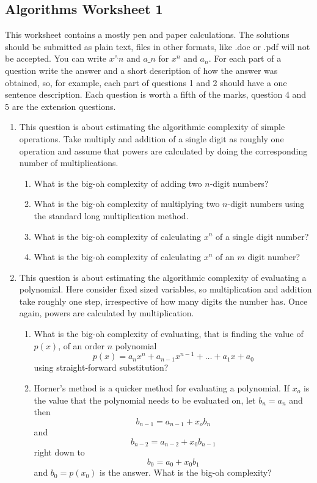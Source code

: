 \documentclass[11pt,a4paper]{scrartcl}
\begin{document}
\subsection*{Algorithms Worksheet 1}

This worksheet contains a mostly pen and paper calculations. The
solutions should be submitted as plain text, files in other formats,
like .doc or .pdf will not be accepted. You can write $x^\wedge n$ and
$a\_n$ for $x^n$ and $a_n$. For each part of a question write the
answer and a short description of how the answer was obtained, so, for
example, each part of questions 1 and 2 should have a one sentence
description. Each question is worth a fifth of the marks, question 4
and 5 are the extension questions.

\begin{enumerate}

\item This question is about estimating the algorithmic
  complexity of simple operations. Take multiply and addition of a
  single digit as roughly one operation and assume that powers are
  calculated by doing the corresponding number of multiplications.

\begin{enumerate}
\item What is the big-oh complexity of adding two $n$-digit numbers?
\item What is the big-oh complexity of multiplying two $n$-digit numbers
  using the standard long multiplication method.
\item What is the big-oh complexity of calculating $x^n$ of a single
  digit number?
\item What is the big-oh complexity of calculating $x^n$ of an $m$
  digit number?
\end{enumerate}


\item This question is about estimating the algorithmic complexity of
  evaluating a polynomial. Here consider fixed sized variables, so
  multiplication and addition take roughly one step, irrespective of
  how many digits the number has. Once again, powers are calculated by
  multiplication.

\begin{enumerate}
\item What is the big-oh complexity of evaluating, that is finding the
  value of $p(x)$, of an order $n$ polynomial
$$p(x)=a_n x^n +a_{n-1}x^{n-1}+\ldots+a_1x+a_0$$
using straight-forward substitution?
\item Horner's method is a quicker method for evaluating a
  polynomial. If $x_o$ is the value that the polynomial needs to be
  evaluated on, let $b_n=a_n$ and then 
$$ b_{n-1}=a_{n-1}+x_o b_{n}$$
and
$$ b_{n-2}=a_{n-2}+x_0 b_{n-1}$$
right down to 
$$ b_0=a_0+x_0b_1$$ and $b_0=p(x_0)$ is the answer. What is the big-oh
complexity?
\end{enumerate}


\end{enumerate}
\end{document}
